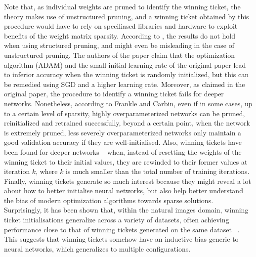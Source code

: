 Note that, as individual weights are pruned to identify the winning ticket, the theory makes use of unstructured pruning, and a winning ticket obtained by this procedure would have to rely on speciliased libraries and hardware to exploit benefits of the weight matrix sparsity. According to \cite{liu2018rethinking}, the results do not hold when using structured pruning, and might even be misleading in the case of unstructured pruning. The authors of the paper claim that the optimization algorithm (ADAM) and the small initial learning rate of the original paper lead to inferior accuracy when the winning ticket is randomly initialized, but this can be remedied using SGD and a higher learning rate. Moreover, as claimed in the original paper, the procedure to identify a winning ticket fails for deeper networks. Nonetheless, according to Frankle and Carbin, even if in some cases, up to a certain level of sparsity, highly overparameterized networks can be pruned, reinitialized and retrained successfully, beyond a certain point, when the network is extremely pruned, less severely overparameterized networks only maintain a good validation accuracy if they are well-initialised. Also, winning tickets have been found for deeper networks ~\autocite{frankle2019lottery} when, instead of resetting the weights of the winning ticket to their initial values, they are rewinded to their former values at iteration $k$, where $k$ is much smaller than the total number of training iterations. Finally, winning tickets generate so much interest because they might reveal a lot about how to better initialise neural networks, but also help better understand the bias of modern optimization algorithms towards sparse solutions. Surprisingly, it has been shown that, within the natural images domain, winning ticket initialisations generalize across a variety of datasets, often achieving performance close to that of winning tickets generated on the same dataset ~\autocite{morcos2019one}. This suggests that winning tickets somehow have an inductive bias generic to neural networks, which generalizes to multiple configurations. 


